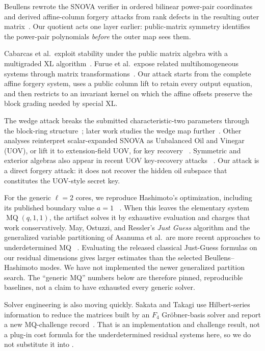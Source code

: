 \documentclass[11pt]{article}
\newcommand{\SNOVA}{\textsf{SNOVA}}
\begin{document}
Beullens rewrote the \SNOVA{} verifier in ordered bilinear power-pair
coordinates and derived affine-column forgery attacks from rank defects in the
resulting outer matrix~\cite{Beullens2024SNOVA}.  Our quotient acts one layer
earlier: public-matrix symmetry identifies the power-pair polynomials
\emph{before} the outer map sees them.

Cabarcas et al.\ exploit stability under the public matrix algebra with a
multigraded XL algorithm~\cite{Cabarcas2025SNOVA}.  Furue et al.\ expose related
multihomogeneous systems through matrix transformations~\cite{FurueEtAl2025}.  Our attack starts from the complete affine forgery
system, uses a public column lift to retain every output equation, and then
restricts to an invariant kernel on which the affine offsets preserve the
block grading needed by special XL.\@

The wedge attack breaks the submitted characteristic-two parameters through
the block-ring structure~\cite{BrosEtAl2026SNOVAWedge}; later work studies the
wedge map further~\cite{TsengEtAl2026Wedge}.  Other analyses reinterpret
scalar-expanded \SNOVA{} as Unbalanced Oil and Vinegar (UOV), or lift it to
extension-field UOV, for key recovery~%
\cite{IkematsuAkiyama2024,LiDing2024,NakamuraEtAl2025}.  Symmetric and
exterior algebras also appear in recent UOV key-recovery attacks~%
\cite{JinEtAl2026,Ran2026}.  Our attack is a direct forgery attack: it does not
recover the hidden oil subspace that constitutes the UOV-style secret key.

For the generic $\ell=2$ cores, we reproduce Hashimoto's optimization,
including its published boundary value $a=1$~%
\cite{Hashimoto2023,Beullens2024SNOVA}.  When this leaves the elementary system
$\operatorname{MQ}(q,1,1)$, the artifact solves it by exhaustive evaluation and
charges that work conservatively.  May, Ostuzzi, and Ressler's \emph{Just
Guess} algorithm and the generalized variable partitioning of Asanuma et al.\ are more recent approaches to underdetermined MQ~%
\cite{MayOstuzziRessler2026,AsanumaEtAl2026}.  Evaluating the released
classical Just-Guess formulas on our residual dimensions gives larger estimates
than the selected Beullens--Hashimoto modes.  We have not implemented the newer
generalized partition search.  The ``generic MQ'' numbers below are therefore
pinned, reproducible baselines, not a claim to have exhausted every generic
solver.

Solver engineering is also moving quickly.  Sakata and Takagi use
Hilbert-series information to reduce the matrices built by an $F_4$
Gr\"obner-basis solver and report a new MQ-challenge
record~\cite{SakataTakagi2026}.  That is an implementation and challenge
result, not a plug-in cost formula for the underdetermined residual systems
here, so we do not substitute it into .
\end{document}
